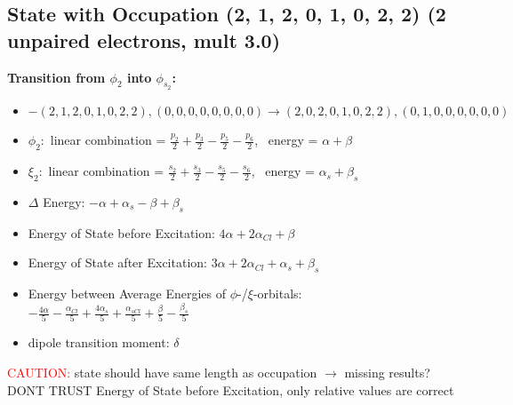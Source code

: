 \documentclass[12pt,a4paper]{article}
\begin{document}
\subsection*{State with Occupation (2, 1, 2, 0, 1, 0, 2, 2) (2 unpaired electrons, mult 3.0)}
        \noindent\textbf{Transition from $\phi_{2}$ into $\phi_{s_{2}}$:}
        \begin{itemize}
            \item $- (2, 1, 2, 0, 1, 0, 2, 2), (0, 0, 0, 0, 0, 0, 0, 0) \rightarrow (2, 0, 2, 0, 1, 0, 2, 2), (0, 1, 0, 0, 0, 0, 0, 0)$
        
            \item $\phi_{2}:$ linear combination = $\frac{p_{2}}{2} + \frac{p_{3}}{2} - \frac{p_{5}}{2} - \frac{p_{6}}{2}$, \
            energy = $\alpha + \beta$
            
            \item $\xi_{2}:$ linear combination = $\frac{s_{2}}{2} + \frac{s_{3}}{2} - \frac{s_{5}}{2} - \frac{s_{6}}{2}$, \
            energy = $\alpha_{s} + \beta_{s}$
            
            \item $\Delta$ Energy: $- \alpha + \alpha_{s} - \beta + \beta_{s}$
            \item Energy of State before Excitation: $4 \alpha + 2 \alpha_{Cl} + \beta$
            \item Energy of State after Excitation: $3 \alpha + 2 \alpha_{Cl} + \alpha_{s} + \beta_{s}$
            \item Energy between Average Energies of $\phi$-/$\xi$-orbitals: \
            $- \frac{4 \alpha}{5} - \frac{\alpha_{Cl}}{5} + \frac{4 \alpha_{s}}{5} + \frac{\alpha_{s Cl}}{5} + \frac{\beta}{5} - \frac{\beta_{s}}{5}$
        
            \item dipole transition moment: $\delta$
        
        \end{itemize}
        
	\textcolor{red}{CAUTION:} state should have same length as occupation $\rightarrow$ missing results?
	DONT TRUST \glqq{}Energy of State before Excitation\grqq{}, only relative values are correct
\end{document}
